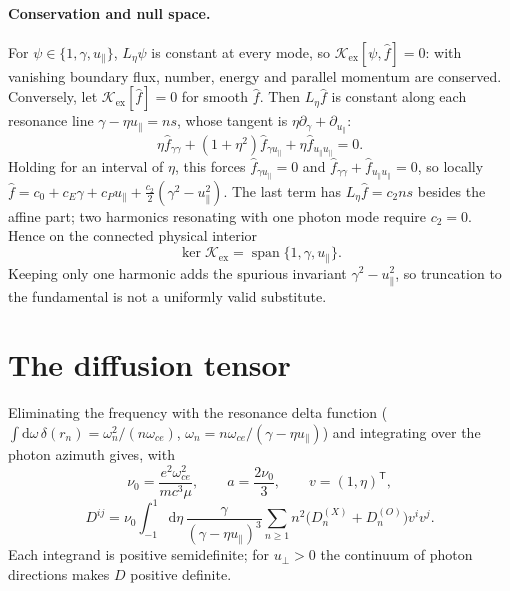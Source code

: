 \documentclass[11pt,a4paper]{article}
\numberwithin{equation}{section}
\newcommand{\dd}{\mathrm{d}}
\newcommand{\upar}{u_\parallel}
\newcommand{\uperp}{u_\perp}
\newcommand{\fh}{\hat f}
\newcommand{\Kex}{\mathcal K_{\mathrm{ex}}}
\begin{document}
\paragraph{Conservation and null space.}
For $\psi\in\{1,\gamma,\upar\}$, $L_\eta\psi$ is constant at every mode, so
$\Kex[\psi,\fh]=0$: with vanishing boundary flux, number, energy and parallel
momentum are conserved. Conversely, let $\Kex[\fh]=0$ for smooth $\fh$. Then
$L_\eta\fh$ is constant along each resonance line $\gamma-\eta\upar=ns$, whose
tangent is $\eta\partial_\gamma+\partial_{\upar}$:
\begin{equation}
\eta\fh_{\gamma\gamma}+(1+\eta^2)\fh_{\gamma\upar}+\eta\fh_{\upar\upar}=0 .
\end{equation}
Holding for an interval of $\eta$, this forces $\fh_{\gamma\upar}=0$ and
$\fh_{\gamma\gamma}+\fh_{\upar\upar}=0$, so locally
$\fh=c_0+c_E\gamma+c_P\upar+\tfrac{c_2}{2}(\gamma^2-\upar^2)$. The last term has
$L_\eta\fh=c_2ns$ besides the affine part; two harmonics resonating with one
photon mode require $c_2=0$. Hence on the connected physical interior
\begin{equation}
\ker\Kex=\operatorname{span}\{1,\gamma,\upar\}.
\end{equation}
Keeping only one harmonic adds the spurious invariant $\gamma^2-\upar^2$, so
truncation to the fundamental is not a uniformly valid substitute.

\section{The diffusion tensor}\label{sec:D}

Eliminating the frequency with the resonance delta function
($\int\dd\omega\,\delta(r_n)=\omega_n^2/(n\omega_{ce})$,
$\omega_n=n\omega_{ce}/(\gamma-\eta\upar)$) and integrating over the photon
azimuth gives, with
\begin{equation}
\nu_0=\frac{e^2\omega_{ce}^2}{mc^3\mu},\qquad a=\frac{2\nu_0}{3},\qquad v=(1,\eta)^{\mathsf T},
\end{equation}
\begin{equation}
D^{ij}=\nu_0\int_{-1}^{1}\dd\eta\,\frac{\gamma}{(\gamma-\eta\upar)^3}\sum_{n\ge1}n^2\bigl(D_n^{(X)}+D_n^{(O)}\bigr)v^iv^j .
\label{eq:Dsum}
\end{equation}
Each integrand is positive semidefinite; for $\uperp>0$ the continuum of
photon directions makes $D$ positive definite.
\end{document}
